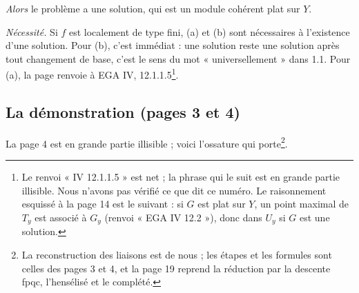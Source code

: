 \documentclass[11pt,a4paper]{article}
\begin{document}
\emph{Alors} le problème a une solution, qui est un module cohérent plat sur
$Y$.

\emph{Nécessité.} Si $f$ est localement de type fini, (a) et (b) sont
nécessaires à l'existence d'une solution. Pour (b), c'est immédiat : une
solution reste une solution après tout changement de base, c'est le sens du
mot « universellement » dans 1.1. Pour (a), la page renvoie à EGA IV,
12.1.1.5\footnote{Le renvoi « IV 12.1.1.5 » est net ; la phrase qui le suit
est en grande partie illisible. Nous n'avons pas vérifié ce que dit ce numéro.
Le raisonnement esquissé à la page 14 est le suivant : si $G$ est plat sur
$Y$, un point maximal de $T_y$ est associé à $G_y$ (renvoi « EGA IV
12.2 »), donc dans $U_y$ si $G$ est une solution.}.

\subsection*{La démonstration (pages 3 et 4)}

La page 4 est en grande partie illisible ; voici l'ossature qui
porte\footnote{La reconstruction des liaisons est de nous ; les étapes et les
formules sont celles des pages 3 et 4, et la page 19 reprend la réduction par
la descente fpqc, l'hensélisé et le complété.}.
\end{document}
